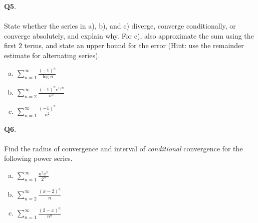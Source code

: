 \documentclass[12pt, oneside]{amsart}
\begin{document}
\newpage
\noindent
\textbf{Q5}. \\ \\ State whether the series in a), b), and c) diverge, converge conditionally, or converge absolutely, and explain why. For c), also approximate the sum using the first $2$ terms, and state an upper bound for the error (Hint: use the remainder estimate for alternating series).
\begin{enumerate}[a)]
  \item
$\displaystyle{\sum_{n=1}^{\infty} \frac{(-1)^{n}}{\log n}}$
    \vspace{6cm}
  \item
    $\displaystyle{\sum_{n=2}^{\infty} \frac{(-1)^{n} e^{1/n}}{n^{2}}}$
\vspace{6cm}
\item
  $ \displaystyle{\sum_{n=1}^{\infty} \frac{{(-1)^{n}}}{n^{2}}}$
  \newpage
\end{enumerate}
\textbf{Q6}. \\ \\ Find the radius of convergence and interval of \emph{conditional} convergence for the following power series.
\begin{enumerate}[a)]
  \item
$\displaystyle{\sum_{n=1}^{\infty} \frac{n^{2} x^{n}}{2^{n}}}$
    \vspace{6cm}
  \item
    $\displaystyle{\sum_{n=2}^{\infty} \frac{(x-2)^{n}}{n}}$
\vspace{6cm}
\item
  $ \displaystyle{\sum_{n=1}^{\infty} \frac{{(2-x)^{n}}}{n^{n}}}$
  \newpage
\end{enumerate}
\end{document}
